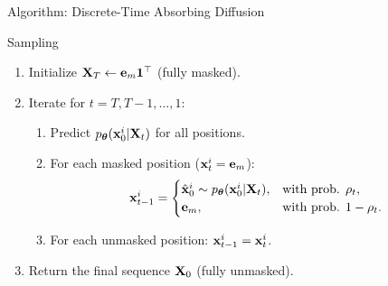 \documentclass{beamer}
\begin{document}
\begin{frame}{Algorithm: Discrete-Time Absorbing Diffusion}
	\begin{block}{Sampling}
		\begin{enumerate}
			\item Initialize $\mathbf{X}_T \leftarrow \mathbf{e}_m \mathbf{1}^\top$ (fully masked).
			\item Iterate for $t = T, T-1, \ldots, 1$:
			\begin{enumerate}
				\item Predict $p_{\boldsymbol{\theta}}(\mathbf{x}_0^i | \mathbf{X}_t)$ for all positions.
				\item For each masked position ($\mathbf{x}_t^i = \mathbf{e}_m$):
				\vspace{-0.3cm}
				\[
					\mathbf{x}_{t-1}^i =
					\begin{cases}
						\hat{\mathbf{x}}_0^i \sim p_{\boldsymbol{\theta}}(\mathbf{x}_0^i | \mathbf{X}_t), & \text{with prob. } \rho_t,\\
						\mathbf{e}_m, & \text{with prob. } 1-\rho_t.
					\end{cases}
				\]
				\vspace{-0.5cm}
				\item For each unmasked position: $\mathbf{x}_{t-1}^i = \mathbf{x}_t^i$.
			\end{enumerate}
			\item Return the final sequence $\mathbf{X}_0$ (fully unmasked).
		\end{enumerate}
	\end{block}
\end{frame}
\end{document}
